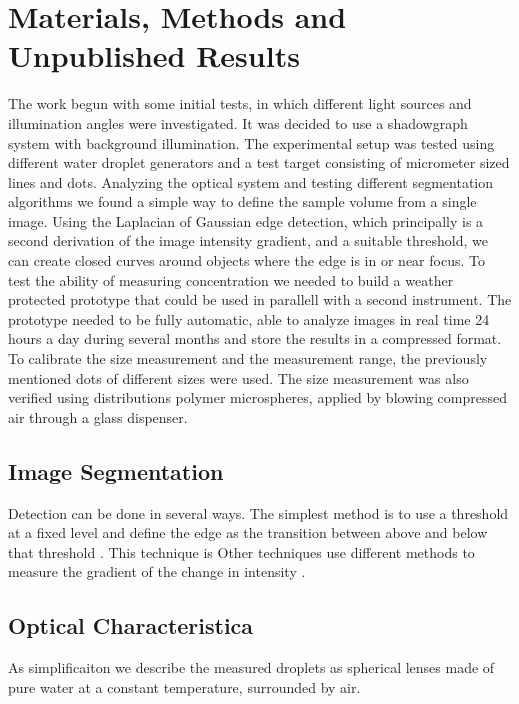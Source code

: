 
\chapter{Materials, Methods and Unpublished Results}
\label{chap:methods}

The work begun with some initial tests, in which different light sources and illumination angles were investigated. It was decided to use a shadowgraph system with background illumination. The experimental setup was tested using different water droplet generators and a test target consisting of micrometer sized lines and dots. Analyzing the optical system and testing different segmentation algorithms we found a simple way to define the sample volume from a single image. Using the Laplacian of Gaussian edge detection, which principally is a second derivation of the image intensity gradient, and a suitable threshold, we can create closed curves around objects where the edge is in or near focus. To test the ability of measuring concentration we needed to build a weather protected prototype that could be used in parallell with a second instrument. The prototype needed to be fully automatic, able to analyze images in real time 24 hours a day during several months and store the results in a compressed format. To calibrate the size measurement and the measurement range, the previously mentioned dots of different sizes were used. The size measurement was also verified using distributions polymer microspheres, applied by blowing compressed air through a glass dispenser.

\section{Image Segmentation}

Detection can be done in several ways. The simplest method is to use a threshold at a fixed level and define the edge as the transition between above and below that threshold \cite{gonz2002}. This technique is Other techniques use different methods to measure the gradient of the change in intensity \cite{canny1986,marr1980}.

\section{Optical Characteristica}

As simplificaiton we describe the measured droplets as spherical lenses made of pure water at a constant temperature, surrounded by air. 

